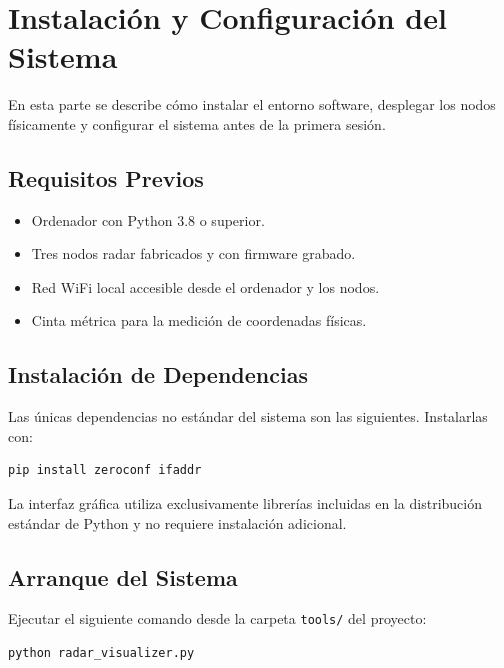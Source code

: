 \chapter{Instalación y Configuración del Sistema}
\label{anexo:instalacion}

En esta parte se describe cómo instalar el entorno software, desplegar los nodos físicamente y configurar el sistema antes de la primera sesión.

\section{Requisitos Previos}

\begin{itemize}
    \item Ordenador con Python 3.8 o superior.
    \item Tres nodos radar fabricados y con firmware grabado.
    \item Red WiFi local accesible desde el ordenador y los nodos.
    \item Cinta métrica para la medición de coordenadas físicas.
\end{itemize}

\section{Instalación de Dependencias}

Las únicas dependencias no estándar del sistema son las siguientes. Instalarlas con:

\begin{verbatim}
pip install zeroconf ifaddr
\end{verbatim}

La interfaz gráfica utiliza exclusivamente librerías incluidas en la distribución estándar de Python y no requiere instalación adicional.

\section{Arranque del Sistema}

Ejecutar el siguiente comando desde la carpeta \texttt{tools/} del proyecto:

\begin{verbatim}
python radar_visualizer.py
\end{verbatim}

